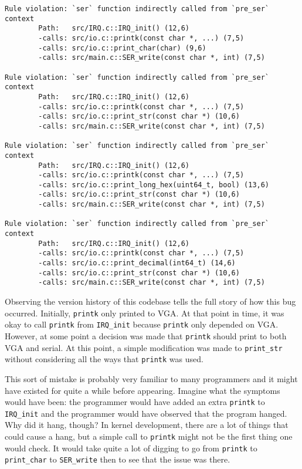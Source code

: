 \noindent\begin{minipage}[t]{\linewidth}
\begin{lstlisting}[caption={Output from funqual when run on simple OS kernel},label={lst:app:pre-malloc:output}]
Rule violation: `ser` function indirectly called from `pre_ser` context
        Path:   src/IRQ.c::IRQ_init() (12,6)
        -calls: src/io.c::printk(const char *, ...) (7,5)
        -calls: src/io.c::print_char(char) (9,6)
        -calls: src/main.c::SER_write(const char *, int) (7,5)

Rule violation: `ser` function indirectly called from `pre_ser` context
        Path:   src/IRQ.c::IRQ_init() (12,6)
        -calls: src/io.c::printk(const char *, ...) (7,5)
        -calls: src/io.c::print_str(const char *) (10,6)
        -calls: src/main.c::SER_write(const char *, int) (7,5)

Rule violation: `ser` function indirectly called from `pre_ser` context
        Path:   src/IRQ.c::IRQ_init() (12,6)
        -calls: src/io.c::printk(const char *, ...) (7,5)
        -calls: src/io.c::print_long_hex(uint64_t, bool) (13,6)
        -calls: src/io.c::print_str(const char *) (10,6)
        -calls: src/main.c::SER_write(const char *, int) (7,5)

Rule violation: `ser` function indirectly called from `pre_ser` context
        Path:   src/IRQ.c::IRQ_init() (12,6)
        -calls: src/io.c::printk(const char *, ...) (7,5)
        -calls: src/io.c::print_decimal(int64_t) (14,6)
        -calls: src/io.c::print_str(const char *) (10,6)
        -calls: src/main.c::SER_write(const char *, int) (7,5)
\end{lstlisting}
\end{minipage}

Observing the version history of this codebase tells the full story of how this bug occurred.  Initially, \lstinline{printk} only printed to VGA.  At that point in time, it was okay to call \lstinline{printk} from \lstinline{IRQ_init} because \lstinline{printk} only depended on VGA.  However, at some point a decision was made that \lstinline{printk} should print to both VGA and serial.  At this point, a simple modification was made to \lstinline{print_str} without considering all the ways that \lstinline{printk} was used. 

This sort of mistake is probably very familiar to many programmers and it might have existed for quite a while before appearing.  Imagine what the symptoms would have been: the programmer would have added an extra \lstinline{printk} to \lstinline{IRQ_init} and the programmer would have observed that the program hanged.  Why did it hang, though?  In kernel development, there are a lot of things that could cause a hang, but a simple call to \lstinline{printk} might not be the first thing one would check.  It would take quite a lot of digging to go from \lstinline{printk} to \lstinline{print_char} to \lstinline{SER_write} then to see that the issue was there.  

